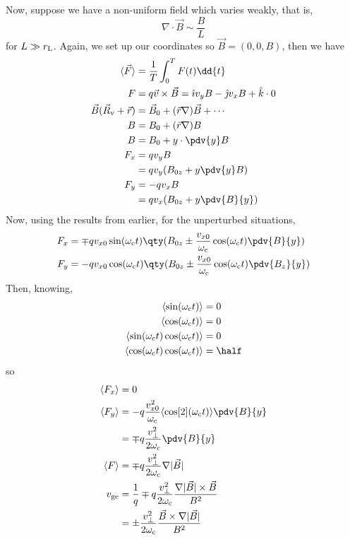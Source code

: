 \documentclass{book}         		                %
\begin{document}
Now, suppose we have a non-uniform field which varies weakly, that is,
\[ \nabla \cdot \vec{B} \sim \frac{B}{L} \] for $L \gg r_{\rm L}$.
Again, we set up our coordinates so $\vec{B} = (0,0, B)$, then we have
\begin{align*}
  \langle \vec{F} \rangle &= \frac{1}{T} \int_0^T F(t) \dd{t} \\
F &= q \vec{v} \times \vec{B} = \hat{\imath} v_y B - \hat{\jmath} v_x B + \hat{k} \cdot 0 \\
\vec{B}(\vec{R}_{\rm v}+\vec{r}) &= \vec{B}_0 + ( \vec{r} \nabla ) \vec{B} + \cdots \\
B &= B_0 + (\vec{r} \nabla) B \\
B &= B_0 + y \cdot \pdv{y} B \\
F_x &= q v_y B \\
&= q v_y (B_{0z} +y \pdv{y}B) \\
F_y &= -q v_x B \\ &= q v_x ( B_{0z} + y \pdv{B}{y} )
\end{align*}
Now, using the results from earlier, for the unperturbed situations,
\begin{align*}
  F_x &= \mp q v_{x0} \sin( \omega_{\rm c} t ) \qty( B_{0z} \pm \frac{v_{x0}}{\omega_{\rm c}} \cos(\omega_{\rm c} t) \pdv{B}{y} ) \\
F_y &= - q v_{x0} \cos( \omega_{\rm c} t) \qty( B_{0z} \pm \frac{v_{x0}}{\omega_{\rm c}} \cos(\omega_{\rm c} t) \pdv{B_z}{y} )
\end{align*}
Then, knowing,
\begin{align*}
  \langle \sin(\omega_{\rm c}t) \rangle &= 0 \\
\langle \cos(\omega_{\rm c}t) \rangle &= 0 \\
\langle \sin(\omega_{\rm c} t) \cos( \omega_{\rm c} t) \rangle &= 0 \\
\langle \cos(\omega_{\rm c} t) \cos( \omega_{\rm c} t) \rangle &= \half 
\end{align*}
so
\begin{align*}
  \langle F_x \rangle &= 0 \\
\langle F_y \rangle &= -q \frac{v_{x0}^2}{\omega_{\rm c}} \langle \cos[2](\omega_{\rm c}t) \rangle \pdv{B}{y} \\
&= \mp q \frac{v_{\perp}^2}{2 \omega_{\rm c}} \pdv{B}{y} \\
\langle F \rangle &= \mp q \frac{v_{\perp}^2}{2 \omega_{\rm c}} \nabla |\vec{B}| \\
v_{\rm ge} &= \frac{1}{q} \mp q \frac{v_{\perp}^2}{2 \omega_{\rm c}} \frac{\nabla |\vec{B}| \times \vec{B}}{B^2} \\
&= \pm \frac{v_{\perp}^2}{2 \omega_{\rm c}} \frac{\vec{B} \times \nabla|\vec{B}|}{B^2}
\end{align*}
\end{document}
